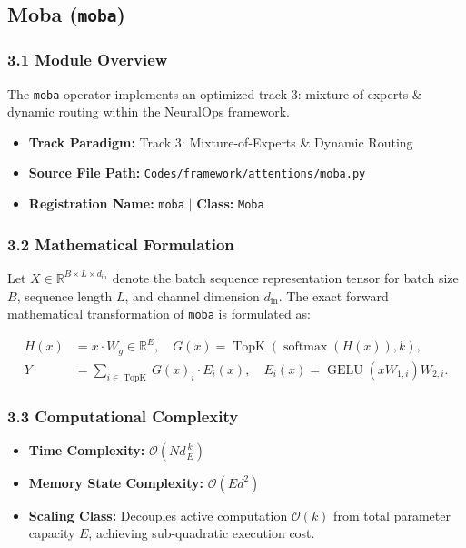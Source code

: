 \subsection{Moba (\texttt{moba})}
\label{sec:app_module_moba}

\subsubsection*{3.1 Module Overview}
The \texttt{moba} operator implements an optimized track 3: mixture-of-experts \& dynamic routing within the NeuralOps framework.
\begin{itemize}
    \item \textbf{Track Paradigm:} Track 3: Mixture-of-Experts & Dynamic Routing
    \item \textbf{Source File Path:} \texttt{Codes/framework/attentions/moba.py}
    \item \textbf{Registration Name:} \texttt{moba} $\mid$ \textbf{Class:} \texttt{Moba}
\end{itemize}

\subsubsection*{3.2 Mathematical Formulation}
Let $X \in \mathbb{R}^{B \times L \times d_{\text{in}}}$ denote the batch sequence representation tensor for batch size $B$, sequence length $L$, and channel dimension $d_{\text{in}}$. The exact forward mathematical transformation of \texttt{moba} is formulated as:

\begin{align}
H(x) &= x \cdot W_g \in \mathbb{R}^{E}, \quad G(x) = \operatorname{TopK}\left(\operatorname{softmax}(H(x)), k\right), \\
Y &= \sum_{i \in \operatorname{TopK}} G(x)_i \cdot E_i(x), \quad E_i(x) = \operatorname{GELU}(x W_{1, i}) W_{2, i}.
\end{align}


\subsubsection*{3.3 Computational Complexity}
\begin{itemize}
    \item \textbf{Time Complexity:} $\mathcal{O}(N d \frac{k}{E})$
    \item \textbf{Memory State Complexity:} $\mathcal{O}(E d^2)$
    \item \textbf{Scaling Class:} Decouples active computation $\mathcal{O}(k)$ from total parameter capacity $E$, achieving sub-quadratic execution cost.
\end{itemize}

